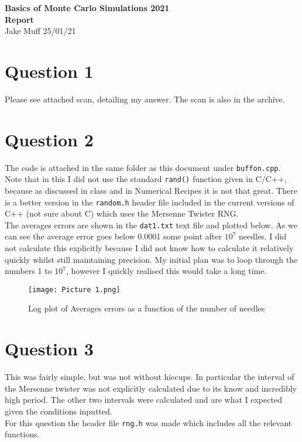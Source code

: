 \documentclass[12pt]{article}
\begin{document}
\normalsize

\baselineskip 14pt

\begin{center}
{\Large {\bf Basics of Monte Carlo Simulations 2021 \ \ \\ Report}} \\
Jake Muff
25/01/21
\end{center}
\section*{Question 1} 
Please see attached scan, detailing my answer. The scan is also in the archive.

\section*{Question 2} 
The code is attached in the same folder as this document under \lstinline{buffon.cpp}. Note that in this I did not use the standard \lstinline{rand()} 
function given in C/C++, because as discussed in class and in Numerical Recipes it is not that great. There is a better version in the \lstinline{random.h} header file included in the current
versions of C++ (not sure about C) which uses the Mersenne Twister RNG.
\\
The averages errors are shown in the \lstinline{dat1.txt} text file and plotted below. As we can see the average error goes below 0.0001 some point after $10^7$ needles. I did not calculate this explicitly because I did not know how to calculate it relatively quickly whilst still maintaining precision. 
My initial plan was to loop through the numbers 1 to $10^7$, however I quickly realised this would take a long time. 

\begin{figure}[h]
    
    \texttt{[image: Picture 1.png]}
    \centering
    \caption{Log plot of Averages errors as a function of the number of needles}
\end{figure}

\section*{Question 3} 
This was fairly simple, but was not without hiccups. In particular the interval of the Mersenne twister was not explicitly calculated due to its know and incredibly high period. The other two intervals were calculated and are what I expected given the conditions inputted. 
\\
For this question the header file \lstinline{rng.h} was made which includes all the relevant functions. 
\end{document}
